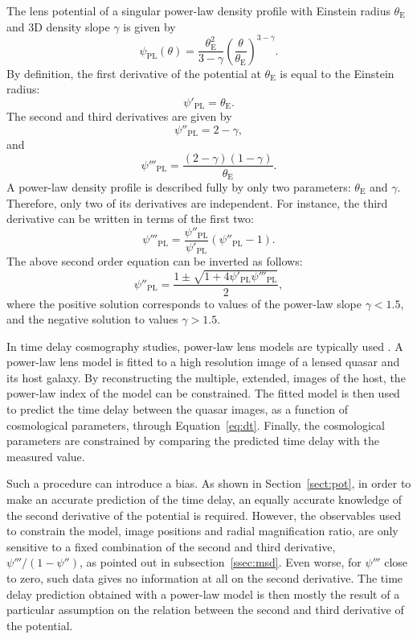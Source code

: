\documentclass[usenatbib]{mnras}
\def\psiii{\psi''}
\def\psiiii{\psi'''}
\def\tein{\theta_{\mathrm{E}}}
\def\Sref#1{Section~\ref{#1}\xspace}
\def\Eref#1{Equation~\ref{#1}\xspace}
\begin{document}
The lens potential of a singular power-law density profile with Einstein radius $\tein$ and 3D density slope $\gamma$ is given by
\begin{equation}
\psi_{\mathrm{PL}}(\theta) = \frac{\tein^2}{3-\gamma}\left(\frac{\theta}{\tein}\right)^{3-\gamma}.
\end{equation}
By definition, the first derivative of the potential at $\tein$ is equal to the Einstein radius: 
\begin{equation}
\psi'_{\mathrm{PL}} = \tein.
\end{equation}
The second and third derivatives are given by
\begin{equation}\label{eq:psiiipl}
\psi''_{\mathrm{PL}} = 2 - \gamma,
\end{equation}
and
\begin{equation}
\psi'''_{\mathrm{PL}} = \frac{(2-\gamma)(1-\gamma)}{\tein}.
\end{equation}
A power-law density profile is described fully by only two parameters: $\tein$ and $\gamma$. Therefore, only two of its derivatives are independent. For instance, the third derivative can be written in terms of the first two:
\begin{equation}
\psi'''_{\mathrm{PL}} = \frac{\psi''_{\mathrm{PL}}}{\psi'_{\mathrm{PL}}}(\psi''_{\mathrm{PL}} - 1).
\end{equation}
The above second order equation can be inverted as follows:
\begin{equation}\label{eq:psiiipl_given_psiiii}
\psi''_{\mathrm{PL}} = \frac{1 \pm \sqrt{1 + 4\psi'_{\mathrm{PL}}\psiiii_{\mathrm{PL}}}}{2},
\end{equation}
where the positive solution corresponds to values of the power-law slope $\gamma < 1.5$, and the negative solution to values $\gamma > 1.5$.

In time delay cosmography studies, power-law lens models are typically used \citep{Suy++10, Suy++13, Won++17}.
A power-law lens model is fitted to a high resolution image of a lensed quasar and its host galaxy. By reconstructing the multiple, extended, images of the host, the power-law index of the model can be constrained.
The fitted model is then used to predict the time delay between the quasar images, as a function of cosmological parameters, through \Eref{eq:dt}. Finally, the cosmological parameters are constrained by comparing the predicted time delay with the measured value.

Such a procedure can introduce a bias. As shown in \Sref{sect:pot}, in order to make an accurate prediction of the time delay, an equally accurate knowledge of the second derivative of the potential is required. However, the observables used to constrain the model, image positions and radial magnification ratio, are only sensitive to a fixed combination of the second and third derivative, $\psiiii/(1-\psiii)$, as pointed out in subsection~\ref{ssec:msd}. 
Even worse, for $\psiiii$ close to zero, such data gives no information at all on the second derivative.
The time delay prediction obtained with a power-law model is then mostly the result of a particular assumption on the relation between the second and third derivative of the potential.
\end{document}
